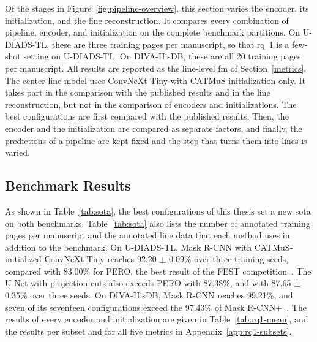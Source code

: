 Of the stages in Figure~\ref{fig:pipeline-overview}, this section varies the encoder, its initialization, and the line reconstruction. It compares every combination of pipeline, encoder, and initialization on the complete benchmark partitions. On U-DIADS-TL, these are three training pages per manuscript, so that \gls{rq}~1 is a few-shot setting on U-DIADS-TL. On DIVA-HisDB, these are all 20 training pages per manuscript. All results are reported as the line-level \gls{fm} of Section~\ref{metrics}. The center-line model uses ConvNeXt-Tiny with CATMuS initialization only. It takes part in the comparison with the published results and in the line reconstruction, but not in the comparison of encoders and initializations. The best configurations are first compared with the published results. Then, the encoder and the initialization are compared as separate factors, and finally, the predictions of a pipeline are kept fixed and the step that turns them into lines is varied.

\subsection{Benchmark Results}
\label{sec:results-rq11}

As shown in Table~\ref{tab:sota}, the best configurations of this thesis set a new \gls{sota} on both benchmarks. Table~\ref{tab:sota} also lists the number of annotated training pages per manuscript and the annotated line data that each method uses in addition to the benchmark. On U-DIADS-TL, Mask R-CNN with CATMuS-initialized ConvNeXt-Tiny reaches 92.20 \(\pm\) 0.09\% over three training seeds, compared with 83.00\% for PERO, the best result of the FEST competition~\cite{Zottin_2025_FEST}. The U-Net with projection cuts also exceeds PERO with 87.38\%, and with 87.65 \(\pm\) 0.35\% over three seeds. On DIVA-HisDB, Mask R-CNN reaches 99.21\%, and seven of its seventeen configurations exceed the 97.43\% of Mask R-CNN+~\cite{signals3030032}. The results of every encoder and initialization are given in Table~\ref{tab:rq1-mean}, and the results per subset and for all five metrics in Appendix~\ref{app:rq1-subsets}.

